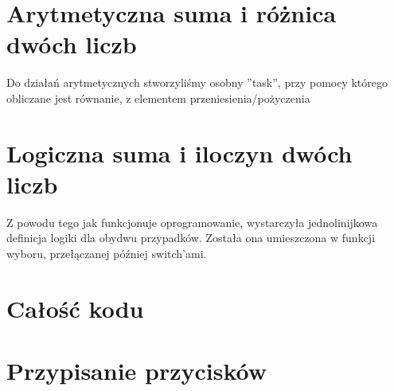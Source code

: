 \section{Arytmetyczna suma i różnica dwóch liczb}
Do działań arytmetycznych stworzyliśmy osobny ''task'', przy pomocy którego obliczane jest równanie, z elementem przeniesienia/pożyczenia



\section{Logiczna suma i iloczyn dwóch liczb}
Z powodu tego jak funkcjonuje oprogramowanie, wystarczyła jednolinijkowa definicja logiki dla obydwu przypadków. Została ona umieszczona w funkcji wyboru, przełączanej później switch'ami.


\clearpage

\section{Całość kodu}



\section{Przypisanie przycisków}


